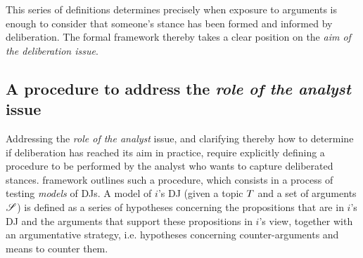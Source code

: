 \documentclass[version=3.21, pagesize, twoside=off, bibliography=totoc, DIV=calc, fontsize=12pt, a4paper, french, english]{scrartcl}
\begin{document}

This series of definitions determines precisely when exposure to arguments is enough to consider that someone’s stance has been formed and informed by deliberation. The formal framework thereby takes a clear position on the \emph{aim of the deliberation issue}.

\subsection{A procedure to address the \emph{role of the analyst} issue}
Addressing the \emph{role of the analyst} issue, and clarifying thereby how to determine if deliberation has reached its aim in practice,  require explicitly defining a procedure to be performed by the analyst who wants to capture deliberated stances.  framework outlines such a procedure, which consists in a process of testing \emph{models} of \acp{DJ}. A model of $i$'s \ac{DJ} (given a topic $T$ and a set of arguments $\mathscr{S}$) is defined as a series of hypotheses concerning the propositions that are in $i$'s \ac{DJ} and the arguments that support these propositions in $i$'s view, together with an argumentative strategy, i.e. hypotheses concerning counter-arguments and means to counter them.
\end{document}
